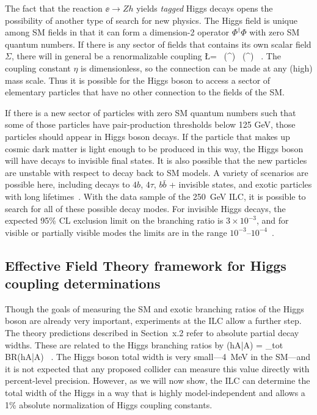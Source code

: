 The fact that the reaction $\ee\to Zh$ yields {\it tagged} Higgs decays opens the 
possibility of another type of search for new physics.
The Higgs field is unique among SM fields in that it can form a dimension-2 operator 
$\Phi^\dagger \Phi$ with zero SM quantum numbers.  If there is any sector of fields that contains its own scalar field $\Sigma$, there will in general be a renormalizable coupling 
\beq
          \Delta \L   =   \eta\    (\Phi^\dagger \Phi) \, (\Sigma^\dagger \Sigma)  \ .
The coupling constant $\eta$ is dimensionless, so the connection can be made at any (high) mass scale.   Thus it is possible for the Higgs boson to access a sector of elementary particles that have no other connection to the fields of the SM. 

If there is a new sector of particles with zero SM quantum numbers such that some of those particles have pair-production thresholds below 125 GeV, those particles should appear in Higgs boson decays.   If the particle that makes up cosmic dark matter is light enough to be produced in this way, the Higgs boson will have decays to invisible final states.   It is also possible that the new particles are unstable with respect to decay back to SM models.   A variety of scenarios are possible here, including decays to $4b$,
$4\tau$, $b\bar b$ + invisible states, and exotic particles with long lifetimes~\cite{Curtin:2013fra}.   With the data sample of the 250~GeV ILC, it is possible to search for all of these possible decay modes.   For  invisible Higgs decays, the expected 95\% CL exclusion limit on the  branching ratio is  $3\times 10^{-3}$, 
and for 
visible or partially visible modes the limits are in the range $10^{-3}$--$10^{-4}$~\cite{Liu:2016zki}. 

\subsection{Effective Field Theory framework for Higgs coupling determinations}


Though the goals of measuring the SM and exotic branching ratios of the Higgs boson are already very important, experiments at the ILC allow a further step.   The theory predictions described in Section~x.2 refer to absolute partial decay widths.   These are 
related to the Higgs branching ratios by 
\beq
           \Gamma(h\to A\bar A) =   \Gamma_{tot} \cdot BR(h\to A\bar A)  \  .
\eeqn
The Higgs boson total width is very small---4~MeV in the SM---and it is not expected that any proposed collider can measure this value directly  with percent-level precision.
However, as we will now show, the ILC can determine the total width of the Higgs in a 
way that is highly model-independent and allows a 1\% absolute normalization of Higgs coupling constants.

